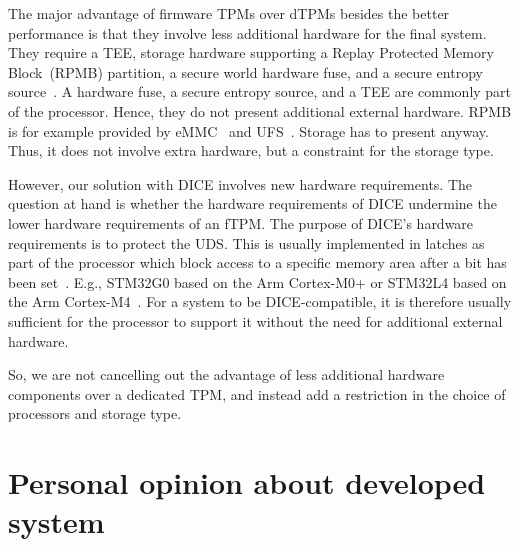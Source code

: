The major advantage of firmware TPMs over dTPMs besides the better performance is that they involve less additional hardware for the final system.
They require a TEE, storage hardware supporting a Replay Protected Memory Block~(RPMB) partition, a secure world hardware fuse, and a secure entropy source~\cite{Raj2015}.
A hardware fuse, a secure entropy source, and a TEE are commonly part of the processor.
Hence, they do not present additional external hardware.
RPMB is for example provided by eMMC~\cite{eMMC} and UFS~\cite{UFS}.
Storage has to present anyway.
Thus, it does not involve extra hardware, but a constraint for the storage type.

However, our solution with DICE involves new hardware requirements.
The question at hand is whether the hardware requirements of DICE undermine the lower hardware requirements of an fTPM\@.
The purpose of DICE's hardware requirements is to protect the UDS\@.
This is usually implemented in latches as part of the processor which block access to a specific memory area after a bit has been set~\cite{Lorych2022}.
E.g., STM32G0 based on the Arm Cortex-M0+ or STM32L4 based on the Arm Cortex-M4~\cite{Lorych2022}.
For a system to be DICE-compatible, it is therefore usually sufficient for the processor to support it without the need for additional external hardware.

So, we are not cancelling out the advantage of less additional hardware components over a dedicated TPM, and instead add a restriction in the choice of processors and storage type.

\section{Personal opinion about developed system}


